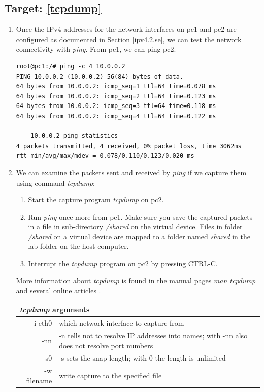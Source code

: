 \documentclass[12pt]{book}
\begin{document}
\subsection{Target: \ref{tcpdump}}\label{tcpdump.se}

\begin{enumerate}[resume*]
\item Once the IPv4 addresses for the network interfaces on pc1 and pc2 are configured as documented in Section \ref{ipv4.2.se}, we can test the network connectivity with \emph{ping}. From pc1, we can ping pc2.

  \begin{lstlisting}
root@pc1:/# ping -c 4 10.0.0.2
PING 10.0.0.2 (10.0.0.2) 56(84) bytes of data.
64 bytes from 10.0.0.2: icmp_seq=1 ttl=64 time=0.078 ms
64 bytes from 10.0.0.2: icmp_seq=2 ttl=64 time=0.123 ms
64 bytes from 10.0.0.2: icmp_seq=3 ttl=64 time=0.118 ms
64 bytes from 10.0.0.2: icmp_seq=4 ttl=64 time=0.122 ms

--- 10.0.0.2 ping statistics ---
4 packets transmitted, 4 received, 0% packet loss, time 3062ms
rtt min/avg/max/mdev = 0.078/0.110/0.123/0.020 ms
  \end{lstlisting}

\item We can examine the packets sent and received by \emph{ping} if we capture them using command \emph{tcpdump}:
\begin{enumerate}
\item Start the capture program \emph{tcpdump} on pc2.
\item Run \emph{ping} once more from pc1. Make sure you save the captured packets in a file in sub-directory \emph{/shared} on the virtual device. Files in folder \emph{/shared} on a virtual device are mapped to a folder named \emph{shared} in the lab folder on the host computer.
\item Interrupt the \emph{tcpdump} program on pc2 by pressing CTRL-C.
\end{enumerate}
  More information about \emph{tcpdump} is found in the manual pages \emph{man tcpdump} and several online articles \cite{tcpdump,tcpdump2}.

  \begin{tabularx}{0.9\textwidth}{r X} \toprule
    \multicolumn{2}{l}{\emph{tcpdump} arguments} \\ \midrule
    -i eth0 & which network interface to capture from \\
    -nn & -n tells not to resolve IP addresses into names; with -nn also does not resolve port numbers\\
    -s0 & -s sets the snap length; with 0 the length is unlimited \\
    -w filename & write capture to the specified file \\ \bottomrule
    \end{tabularx}


\end{enumerate}
\end{document}
